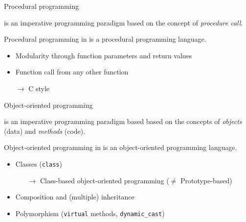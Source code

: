 \begin{frame}{Procedural programming}{}
  \begin{definition}
     is an imperative programming paradigm based on the concept of \emph{procedure call}.
  \end{definition}
  \begin{block}{Procedural programming in \CCLang}
    \CCLang is a procedural programming language.
    \begin{itemize}
    \item
      Modularity through function parameters and return values
    \item
      Function call from any other function
    \item[$\to$]
      C style
    \end{itemize}
  \end{block}
\end{frame}

\begin{frame}{Object-oriented programming}{}
  \begin{definition}
     is an imperative programming paradigm based based on the concepts of \emph{objects} (data) and \emph{methods} (code).
  \end{definition}
  \begin{block}{Object-oriented programming in \CCLang}
    \CCLang is an object-oriented programming language.
    \begin{itemize}
    \item
      Classes (\lstinline!class!)
      \begin{itemize}
      \item[$\to$]
        Class-based object-oriented programming ($\neq$ Prototype-based)
      \end{itemize}
    \item
      Composition and (multiple) inheritance
    \item
      Polymorphism (\lstinline!virtual! methods, \lstinline!dynamic_cast!)
    \end{itemize}
  \end{block}
\end{frame}

